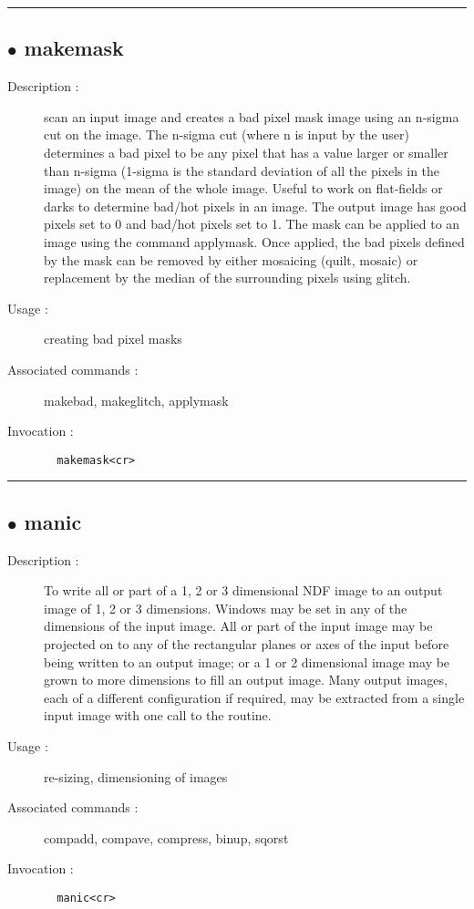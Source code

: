 \hrule \subsection*{$\bullet$ makemask}
\begin{description}
\item[Description :] scan an input image and creates a bad pixel mask image using
an n-sigma cut on the image.  The n-sigma cut (where n is input by the
user) determines a bad pixel to be any pixel that has a value larger or
smaller than n-sigma (1-sigma is the standard deviation of all the pixels
in the image) on the mean of the whole image.  Useful to work on
flat-fields or darks to determine bad/hot pixels in an image.  The output
image has good pixels set to 0 and bad/hot pixels set to 1.  The mask can
be applied to an image using the command applymask.  Once applied, the
bad pixels defined by the mask can be removed by either mosaicing (quilt,
mosaic) or replacement by the median of the surrounding pixels using
glitch.
\item[Usage :] creating bad pixel masks
\item[Associated commands :] makebad, makeglitch, applymask
\item[Invocation :]

\verb+  makemask<cr> +\end{description}

\hrule \subsection*{$\bullet$ manic}
\begin{description}
\item[Description :] To write all or part of a 1, 2 or 3 dimensional NDF image to an
output image of 1, 2 or 3 dimensions. Windows may be set in any of the
dimensions of the input image. All or part of the input image may be
projected on to any of the rectangular planes or axes of the input before
being written to an output image; or a 1 or 2 dimensional image may be
grown to more dimensions to fill an output image. Many output images,
each of a different configuration if required, may be extracted from a
single input image with one call to the routine.
\item[Usage :] re-sizing, dimensioning of images
\item[Associated commands :] compadd, compave, compress, binup, sqorst
\item[Invocation :]

\verb+  manic<cr> +\end{description}

